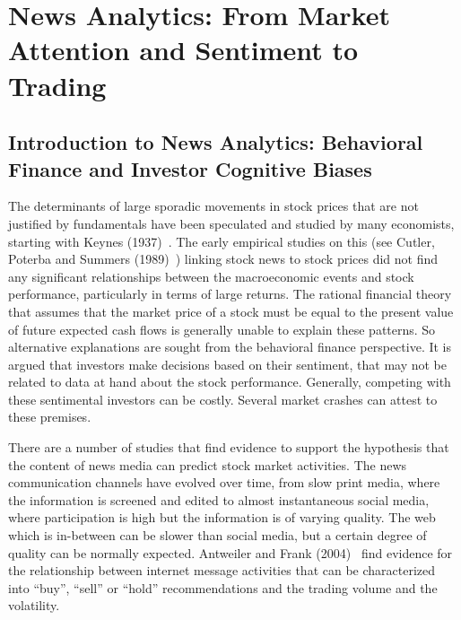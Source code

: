 \chapter{News Analytics: From Market Attention and Sentiment to Trading \label{chap:ch_news_an}}
\section{Introduction to News Analytics: Behavioral Finance and Investor Cognitive Biases}
 
 The determinants of large sporadic movements in stock prices that are not justified by fundamentals have been speculated and studied by many economists, starting with Keynes (1937)~\cite{keynes1937general}. The early empirical studies on this (see Cutler, Poterba and Summers (1989)~\cite{cutler1988moves}) linking stock news to stock prices did not find any significant relationships between the macroeconomic events and stock performance, particularly in terms of large returns. The rational financial theory that assumes that the market price of a stock must be equal to the present value of future expected cash flows is generally unable to explain these patterns. So alternative explanations are sought from the behavioral finance perspective. It is argued that investors make decisions based on their sentiment, that may not be related to data at hand about the stock performance. Generally, competing with these sentimental investors can be costly. Several market crashes can attest to these premises.
 
 
 There are a number of studies that find evidence to support the hypothesis that the content of news media can predict stock market activities. The news communication channels have evolved over time, from slow print media, where the information is screened and edited to almost instantaneous social media, where participation is high but the information is of varying quality. The web which is in-between can be slower than social media, but a certain degree of quality can be normally expected. Antweiler and Frank (2004)~\cite{antweiler2004all} find evidence for the relationship between internet message activities that can be characterized into ``buy'', ``sell'' or ``hold'' recommendations and the trading volume and the volatility.
 

